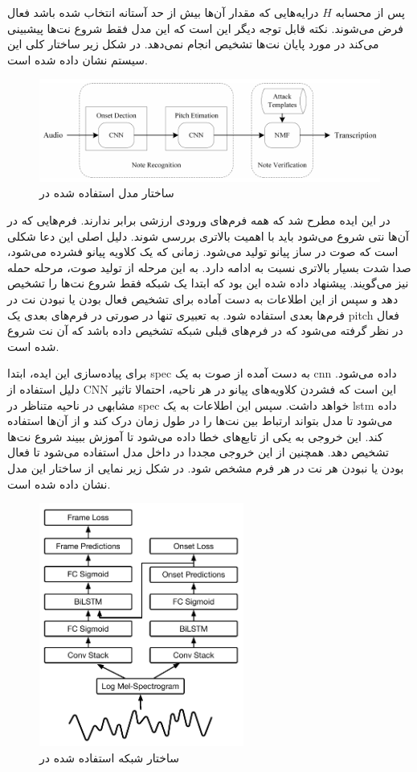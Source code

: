 پس از محسابه $H$ درایه‌هایی که مقدار آن‌ها بیش از حد آستانه انتخاب شده باشد فعال
فرض می‌شوند. نکته قابل توجه دیگر این است که این مدل فقط شروع نت‌ها پیشبینی
می‌کند در مورد پایان نت‌ها تشخیص انجام نمی‌دهد. در شکل زیر ساختار کلی این سیستم
نشان داده شده است.
\begin{figure}[ht]
    \centering
    \includegraphics[width=12cm]{./statics/wang2017two_architecture.png}
    \caption{ساختار مدل استفاده شده در \cite{wang2017two}}
\end{figure}

در \cite{hawthorne2017onsets} این ایده مطرح شد که همه فرم‌‌های ورودی ارزشی برابر
ندارند. فرم‌هایی که در آن‌ها نتی شروع می‌شود باید با اهمیت بالاتری بررسی شوند.
دلیل اصلی این دعا شکلی است که صوت در ساز پیانو تولید می‌شود. زمانی که یک کلاویه
پیانو فشرده می‌شود، صدا شدت بسیار بالاتری نسبت به ادامه دارد. به این مرحله از
تولید صوت، مرحله حمله نیز می‌گویند. پیشنهاد داده شده این بود که ابتدا یک شبکه
فقط شروع نت‌ها را تشخیص دهد و سپس از این اطلاعات به دست آماده برای تشخیص فعال
بودن یا نبودن نت‌ در فرم‌ها بعدی استفاده شود. به تعبیری تنها در صورتی در فرم‌های
بعدی یک \gls{pitch} فعال در نظر گرفته می‌شود که در فرم‌های قبلی شبکه تشخیص داده
باشد که آن نت شروع شده است.

برای پیاده‌سازی این ایده، ابتدا \gls{spec} به دست آمده از صوت به یک \gls{cnn}
داده می‌شود. دلیل استفاده از \gls{CNN} این است که فشردن کلاویه‌های پیانو در هر
ناحیه، احتمالا تاثیر مشابهی در ناحیه متناظر در \gls{spec} خواهد داشت. سپس این
اطلاعات به یک \gls{lstm} داده می‌شود تا مدل بتواند ارتباط بین نت‌ها را در طول
زمان درک کند و از آن‌ها استفاده کند. این خروجی به یکی از تابع‌های خطا داده
می‌شود تا آموزش ببیند شروع نت‌ها تشخیص دهد. همچنین از این خروجی مجددا در داخل
مدل استفاده می‌شود تا فعال بودن یا نبودن هر نت در هر فرم مشخص شود. در شکل زیر
نمایی از ساختار این مدل نشان داده شده است.
\begin{figure}[ht]
    \centering
    \includegraphics[height=8cm]{./statics/onset_onframe_architecture.png}
    \caption{ساختار شبکه استفاده شده در \cite{hawthorne2017onsets}}
\end{figure}

